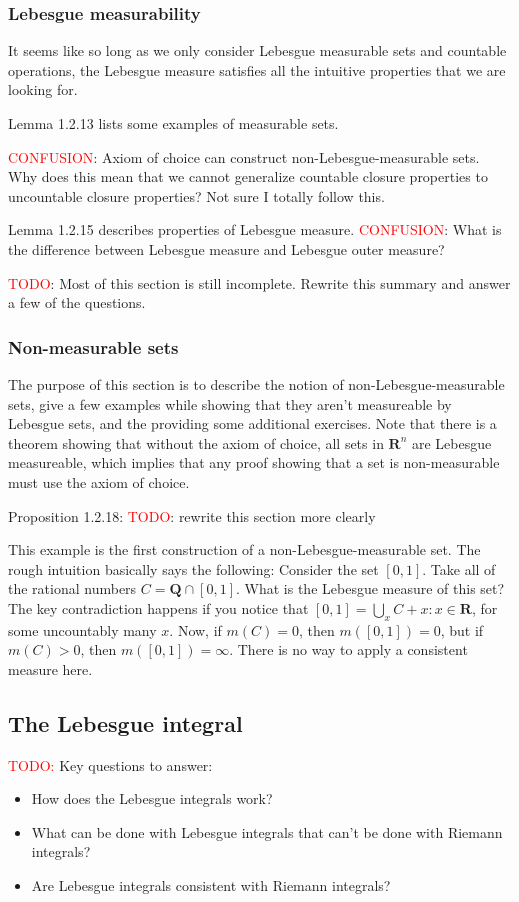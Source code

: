 \documentclass[answers,12pt]{exam}
\begin{document}
\subsubsection{Lebesgue measurability}
It seems like so long as we only consider Lebesgue measurable sets and countable operations, the Lebesgue measure satisfies all the intuitive properties that we are looking for.

Lemma 1.2.13 lists some examples of measurable sets.

\textcolor{red}{CONFUSION}: Axiom of choice can construct non-Lebesgue-measurable sets.
Why does this mean that we cannot generalize countable closure properties to uncountable closure properties?
Not sure I totally follow this.

Lemma 1.2.15 describes properties of Lebesgue measure.
\textcolor{red}{CONFUSION}: What is the difference between Lebesgue measure and Lebesgue outer measure?

\textcolor{red}{TODO}: Most of this section is still incomplete.
Rewrite this summary and answer a few of the questions. 

\subsubsection{Non-measurable sets}
The purpose of this section is to describe the notion of non-Lebesgue-measurable sets, give a few examples while showing that they aren't measureable by Lebesgue sets, and the providing some additional exercises.
Note that there is a theorem showing that without the axiom of choice, all sets in $\mathbf{R}^n$ are Lebesgue measureable, which implies that any proof showing that a set is non-measurable must use the axiom of choice.

Proposition 1.2.18: \textcolor{red}{TODO}: rewrite this section more clearly

This example is the first construction of a non-Lebesgue-measurable set.
The rough intuition basically says the following:
Consider the set $[0,1]$.
Take all of the rational numbers $C =\mathbf{Q} \cap [0,1]$.
What is the Lebesgue measure of this set?
The key contradiction happens if you notice that $[0,1] = \bigcup_{x} C + x: x \in \mathbf{R}$, for some uncountably many $x$.
Now, if $m(C) = 0$, then $m([0,1])=0$, but if $m(C)>0$, then $m([0,1]) = \infty$. 
There is no way to apply a consistent measure here. 

\subsection{The Lebesgue integral}
\textcolor{red}{TODO:} Key questions to answer:
\begin{itemize}[noitemsep]
    \item How does the Lebesgue integrals work?
    \item What can be done with Lebesgue integrals that can't be done with Riemann integrals?
    \item Are Lebesgue integrals consistent with Riemann integrals?
\end{itemize}
\end{document}
